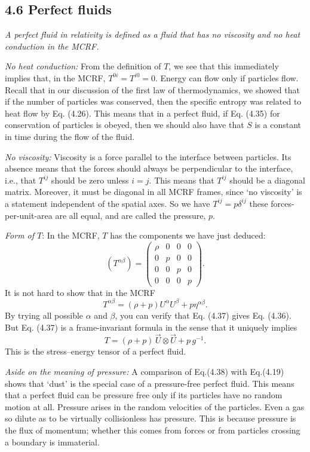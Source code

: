 \documentclass[12pt]{book}
\begin{document}
    \subsection{4.6 Perfect fluids}

    \textit{A perfect fluid in relativity is defined as a fluid that has no viscosity and no heat conduction in the MCRF.}

    \textit{No heat conduction:} From the definition of \(T\), we see that this immediately implies that, in the MCRF, \(T^{0i} = T^{i0} = 0\). Energy can flow only if particles flow. Recall that in our discussion of the first law of thermodynamics, we showed that if the number of particles was conserved, then the specific entropy was related to heat flow by Eq. (4.26). This means that in a perfect fluid, if Eq. (4.35) for conservation of particles is obeyed, then we should also have that \(S\) is a constant in time during the flow of the fluid.

    \textit{No viscosity:} Viscosity is a force parallel to the interface between particles. Its absence means that the forces should always be perpendicular to the interface, i.e., that \(T^{ij}\) should be zero unless \(i = j\). This means that \(T^{ij}\) should be a diagonal matrix. Moreover, it must be diagonal in all MCRF frames, since ‘no viscosity’ is a statement independent of the spatial axes. So we have \(T^{ij} = p \delta^{ij}\) these forces-per-unit-area are all equal, and are called the pressure, \(p\).

    \textit{Form of  \(T\)}: In the MCRF, \(T\) has the components we have just deduced:
    \[
    (T^{\alpha\beta}) =
    \begin{pmatrix}
    \rho & 0 & 0 & 0 \\
    0 & p & 0 & 0 \\
    0 & 0 & p & 0 \\
    0 & 0 & 0 & p
    \end{pmatrix}.
    \tag{4.36}
    \]
    It is not hard to show that in the MCRF
    \[
    T^{\alpha\beta} = (\rho + p) U^\alpha U^\beta + p \eta^{\alpha\beta}. \tag{4.37}
    \]
    By trying all possible \(\alpha\) and \(\beta\), you can verify that Eq. (4.37) gives Eq. (4.36). But Eq. (4.37) is a frame-invariant formula in the sense that it uniquely implies
    \[
    T = (\rho + p) \, \vec{U} \otimes \vec{U} + p \, g^{-1}. \tag{4.38}
    \]
    This is the stress–energy tensor of a perfect fluid.

    \textit{Aside on the meaning of pressure:}
    A comparison of Eq.(4.38) with Eq.(4.19) shows that ‘dust’ is the special case of a pressure-free perfect fluid. This means that a perfect fluid can be pressure free only if its particles have no random motion at all. Pressure arises in the random velocities of the particles. Even a gas so dilute as to be virtually collisionless has pressure. This is because pressure is the flux of momentum; whether this comes from forces or from particles crossing a boundary is immaterial.
\end{document}
